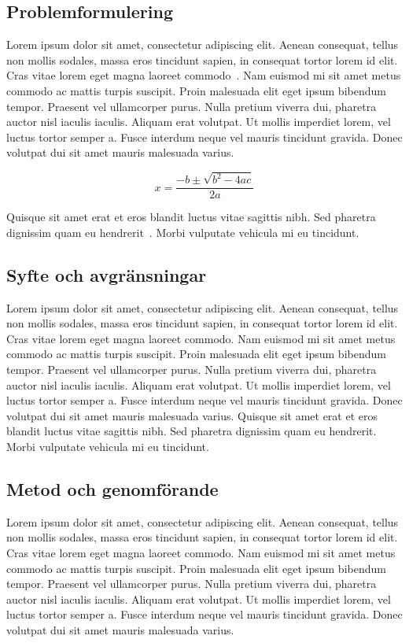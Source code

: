 \documentclass[11pt,a4paper]{article}
\begin{document}
\subsection{Problemformulering}
Lorem ipsum dolor sit amet, consectetur adipiscing elit. Aenean
consequat, tellus non mollis sodales, massa eros tincidunt sapien, in
consequat tortor lorem id elit. Cras vitae lorem eget magna laoreet
commodo~\cite{bib:mattson.2008}. Nam euismod mi sit amet metus commodo
ac mattis turpis suscipit. Proin malesuada elit eget ipsum bibendum
tempor. Praesent vel ullamcorper purus. Nulla pretium viverra dui,
pharetra auctor nisl iaculis iaculis. Aliquam erat volutpat. Ut mollis
imperdiet lorem, vel luctus tortor semper a. Fusce interdum neque vel
mauris tincidunt gravida. Donec volutpat dui sit amet mauris malesuada
varius.

\begin{equation}
  x=\frac{-b\pm \sqrt{b^2-4ac}}{2a}
\end{equation}

Quisque sit amet erat et eros blandit luctus vitae sagittis nibh. Sed
pharetra dignissim quam eu hendrerit~\cite{bib:persson.2010.01}. Morbi
vulputate vehicula mi eu tincidunt.

\subsection{Syfte och avgränsningar}
Lorem ipsum dolor sit amet, consectetur adipiscing elit. Aenean
consequat, tellus non mollis sodales, massa eros tincidunt sapien, in
consequat tortor lorem id elit. Cras vitae lorem eget magna laoreet
commodo. Nam euismod mi sit amet metus commodo ac mattis turpis
suscipit. Proin malesuada elit eget ipsum bibendum tempor. Praesent
vel ullamcorper purus. Nulla pretium viverra dui, pharetra auctor nisl
iaculis iaculis. Aliquam erat volutpat. Ut mollis imperdiet lorem, vel
luctus tortor semper a. Fusce interdum neque vel mauris tincidunt
gravida. Donec volutpat dui sit amet mauris malesuada varius. Quisque
sit amet erat et eros blandit luctus vitae sagittis nibh. Sed pharetra
dignissim quam eu hendrerit. Morbi vulputate vehicula mi eu tincidunt.

\subsection{Metod och genomförande}
Lorem ipsum dolor sit amet, consectetur adipiscing elit. Aenean
consequat, tellus non mollis sodales, massa eros tincidunt sapien, in
consequat tortor lorem id elit. Cras vitae lorem eget magna laoreet
commodo. Nam euismod mi sit amet metus commodo ac mattis turpis
suscipit. Proin malesuada elit eget ipsum bibendum tempor. Praesent
vel ullamcorper purus. Nulla pretium viverra dui, pharetra auctor nisl
iaculis iaculis. Aliquam erat volutpat. Ut mollis imperdiet lorem, vel
luctus tortor semper a. Fusce interdum neque vel mauris tincidunt
gravida. Donec volutpat dui sit amet mauris malesuada varius.
\end{document}
